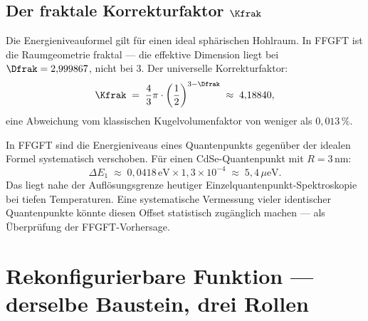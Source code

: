 \subsection{Der fraktale Korrekturfaktor \texorpdfstring{$\Kfrak$}{K\_frak}}
\label{sec:kfrak}

Die Energieniveauformel gilt für einen ideal sphärischen Hohlraum.
In FFGFT ist die Raumgeometrie fraktal --- die effektive Dimension
liegt bei $\Dfrak = 2{,}999867$, nicht bei 3.
Der universelle Korrekturfaktor:
\begin{equation}
  \Kfrak \;=\; \frac{4}{3}\pi \cdot
  \left(\frac{1}{2}\right)^{3 - \Dfrak}
  \;\approx\; 4{,}18840,
\end{equation}
eine Abweichung vom klassischen Kugelvolumenfaktor von weniger
als $0{,}013\,\%$.

\begin{keyresult}
In FFGFT sind die Energieniveaus eines Quantenpunkts gegenüber
der idealen Formel systematisch verschoben. Für einen CdSe-Quantenpunkt
mit $R = 3$\,nm:
\[
  \Delta E_1 \;\approx\; 0{,}0418\,\text{eV} \times 1{,}3 \times 10^{-4}
  \;\approx\; 5{,}4\,\mu\text{eV}.
\]
Das liegt nahe der Auflösungsgrenze heutiger
Einzelquantenpunkt-Spektroskopie bei tiefen Temperaturen.
Eine systematische Vermessung vieler identischer Quantenpunkte
könnte diesen Offset statistisch zugänglich machen ---
als Überprüfung der FFGFT-Vorhersage.
\end{keyresult}

\section{Rekonfigurierbare Funktion --- derselbe Baustein, drei Rollen}
\label{sec:rollen}

\begin{center}
\end{center}


